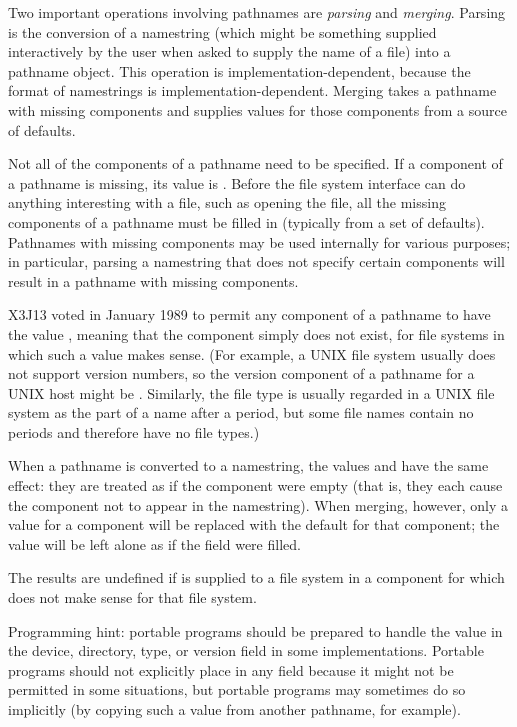 Two important operations involving pathnames are {\it parsing} and
{\it merging}.  Parsing is the conversion of a namestring (which might be
something supplied interactively by the user when asked to supply the
name of a file) into a pathname object.  This operation is
implementation-dependent, because the format of namestrings
is implementation-dependent.
Merging takes a pathname with missing components
and supplies values for those components from a source of defaults.

Not all of the components of a pathname need to be specified.  If a
component of a pathname is missing, its value is {\nil}.  Before the file
system interface can do anything interesting with a file, such as opening the
file, all the missing components of a pathname must be filled in
(typically from a set of defaults).  Pathnames with missing components
may be used internally for various purposes;
in particular, parsing a namestring
that does not specify certain components will result in a pathname with
missing components.

\begin{newer}
X3J13 voted in January 1989 
to permit any component of a pathname to have the value ,
meaning that the component simply does not exist,
for file systems in which such a value makes sense.
(For example, a UNIX file system usually does not support version numbers,
so the version component of a pathname for a UNIX host might be
.  Similarly,
the file type is usually regarded in a UNIX file system as the part
of a name after a period, but some file names contain no periods and therefore have
no file types.)

  When a pathname is converted to a namestring, the values  and 
  have the same effect: they
  are treated as if the component were empty (that is, they each cause the
  component not to appear in the namestring).
  When merging, however, only a  value for a component will be
  replaced with the default for that component; the value 
  will be left alone as if the field were filled.

  The results are undefined if  is supplied
  to a file system in a component for which
   does not make sense for that file system.

  Programming hint:
  portable programs should be prepared to handle the value  in the device,
  directory, type, or version field in some implementations.
  Portable programs should not explicitly place  in any
  field because it might not be permitted in some situations,
  but portable programs may sometimes do so implicitly (by copying
  such a value from another pathname, for example).
\end{newer}


